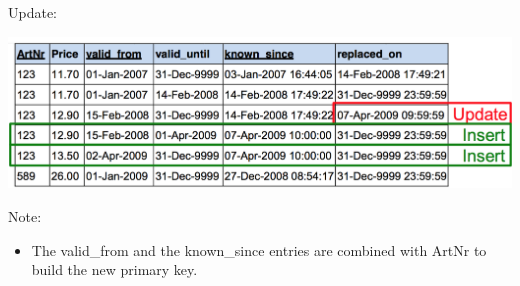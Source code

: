 \begin{breakbox}
\newline Update:
\begin{center}
	\includegraphics[width=.15\textwidth]{slides_images/bi_temporal_update}
\end{center}
Note:
\begin{itemize}
	\item The valid\_from and the known\_since entries are combined with ArtNr to build the new primary key.
\end{itemize}
\end{breakbox}
